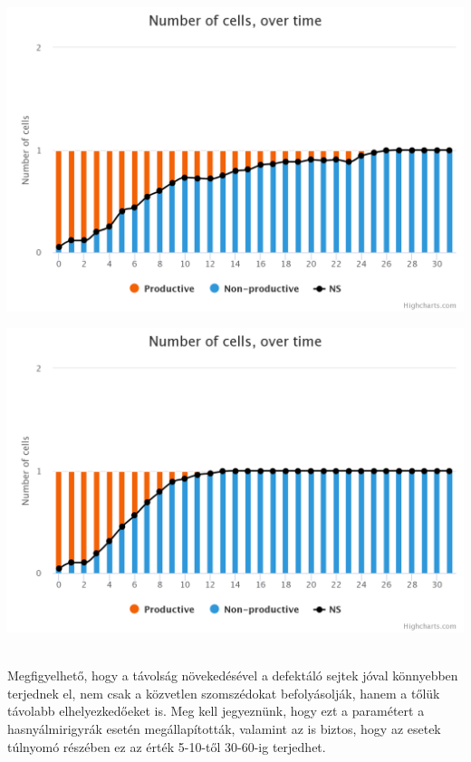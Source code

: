\begin{minipage}{\linewidth}
	\centering
	\begin{multicols}{2}
		\begin{Figure}
			\centering
			\includegraphics[width=\linewidth]{images/diffdist2}
		\end{Figure}
		\begin{Figure}
			\centering
			\includegraphics[width=\linewidth]{images/diffdist5}
		\end{Figure}
	\end{multicols}
\end{minipage}\\

Megfigyelhető, hogy a távolság növekedésével a defektáló sejtek jóval könnyebben terjednek el, nem csak a közvetlen szomszédokat befolyásolják, hanem a tőlük távolabb elhelyezkedőeket is. Meg kell jegyeznünk, hogy ezt a paramétert a hasnyálmirigyrák esetén megállapították\cite{archetti2015heterogeneity}, valamint az is biztos, hogy az esetek túlnyomó részében ez az érték 5-10-től 30-60-ig terjedhet\cite{archetti2016cooperation}.
